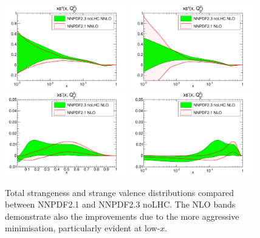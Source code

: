\clearpage
\begin{figure}[h!]
\centering
\includegraphics[width=0.48\textwidth]{6-LHCimpact/figs/xsp_Q_2_log-21-vs-23noLHC-nnlo.pdf}
\includegraphics[width=0.48\textwidth]{6-LHCimpact/figs/xsp_Q_2_log-21-vs-23noLHC.pdf}\\
\includegraphics[width=0.48\textwidth]{6-LHCimpact/figs/xsm_Q_2_lin-21-vs-23noLHC.pdf}
\includegraphics[width=0.48\textwidth]{6-LHCimpact/figs/xsm_Q_2_log-21-vs-23noLHC.pdf}
\caption[Total strangeness and strange valence distributions compared between NNPDF2.1 and NNPDF2.3 noLHC]{Total strangeness and strange valence distributions compared between NNPDF2.1 and NNPDF2.3 noLHC. The NLO bands demonstrate also the improvements due to the more aggressive minimisation, particularly evident at low-$x$.} \label{fig:23noLHCvs21_strangeness}
\end{figure}


